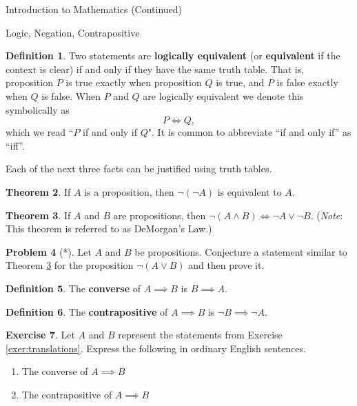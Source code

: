 \documentclass[11pt]{article}
\theoremstyle{definition}
\newtheorem{theorem}{Theorem}[section]
\newtheorem{definition}[theorem]{Definition}
\newtheorem{exercise}[theorem]{Exercise}
\newtheorem{problem}[theorem]{Problem}
\begin{document}
\begin{section}{Introduction to Mathematics (Continued)}
\begin{subsection}{Logic, Negation, Contrapositive}
\begin{definition}
Two statements are \textbf{logically equivalent} (or \textbf{equivalent} if the context is clear) if and only if they have the same truth table.  That is, proposition $P$ is true exactly when proposition $Q$ is true, and $P$ is false exactly when $Q$ is false.  When $P$ and $Q$ are logically equivalent we denote this symbolically as 
\[
P \iff Q,
\]
which we read ``$P$ if and only if $Q$".  It is common to abbreviate ``if and only if'' as ``iff''.
\end{definition}

Each of the next three facts can be justified using truth tables.

\begin{theorem}
If $A$ is a proposition, then $\neg(\neg A)$ is equivalent to $A$.
\end{theorem}

\begin{theorem}\label{thm:demorgan}
If $A$ and $B$ are propositions, then $\neg(A \wedge B) \iff \neg A \vee \neg B$.  (\emph{Note}: This theorem is referred to as DeMorgan's Law.)
\end{theorem}

\begin{problem}[*]
Let $A$ and $B$ be propositions.  Conjecture a statement similar to Theorem \ref{thm:demorgan} for the proposition $\neg(A\vee B)$ and then prove it.
\end{problem}

\begin{definition}
The \textbf{converse} of $A \implies B$ is $B \implies A$.
\end{definition}

\begin{definition}
The \textbf{contrapositive} of $A \implies B$ is $\neg B \implies \neg A$.
\end{definition}

\begin{exercise}
Let $A$ and $B$ represent the statements from Exercise \ref{exer:translations}.  Express the following in ordinary English sentences.
\begin{enumerate}
\item The converse of $A \implies B$
\item The contrapositive of $A \implies B$
\end{enumerate}
\end{exercise}


\end{subsection}
\end{section}
\end{document}
